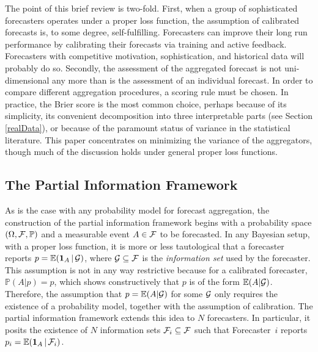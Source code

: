 \documentclass[12pt]{article}
\renewcommand{\P}{\mathbb{P}}
\newcommand{\E}{\mathbb{E}}
\theoremstyle{definition}
\theoremstyle{definition}
\def\one{{\bf 1}}
\def\F{{\cal F}}
\def\G{{\cal G}}
\def\P{{\mathbb P}}
\def\E{{\mathbb E}}
\def\|{\, | \,}
\begin{document}
The point of this brief review is two-fold.  First, when a group of
sophisticated forecasters operates under a proper loss function,
the assumption of calibrated forecasts is, to some degree,
self-fulfilling.  Forecasters can improve their long run performance
by calibrating their forecasts via training and active
feedback. Forecasters with competitive
motivation, sophistication, and historical data will probably do so. Secondly, the
assessment of the aggregated forecast is not uni-dimensional any more
than is the assessment of an individual forecast.  In order to compare
different aggregation procedures, a scoring rule must be chosen.  In
practice, the Brier score is the most common choice, perhaps because
of its simplicity, its convenient decomposition into three
interpretable parts (see Section \ref{realData}), or because of the
paramount status of variance in the statistical literature. This paper concentrates on minimizing the variance of the aggregators, though
 much of the discussion holds under general proper loss
functions.

\subsection{The Partial Information Framework}
\label{PIFintro}
As is the case with any probability model for forecast aggregation, the construction  of the partial information framework begins with
 a probability space $(\Omega, \F , \P)$ and a
measurable event $A \in \F$ to be forecasted.  In any Bayesian setup,
with a proper loss function, it is more or less tautological that a
forecaster reports $p = \E (\one_A \| \G)$, where $\G \subseteq \F$ is
the \textit{information set} used by the forecaster. This assumption is not in any way restrictive because for a calibrated forecaster, $\P(A | p) = p$, which shows constructively that $p$ is of the form $\E(A | \G)$. Therefore, the assumption that $p =  \E(A | \G)$ for some $\G$ only requires the existence of a probability model, together with the assumption of calibration. The
partial information framework extends this idea to $N$
forecasters. In particular, it posits the existence of $N$
information sets $\F_i \subseteq \F$ such that Forecaster~$i$
reports $p_i = \E (\one_A \| \F_i)$. 
\end{document}
